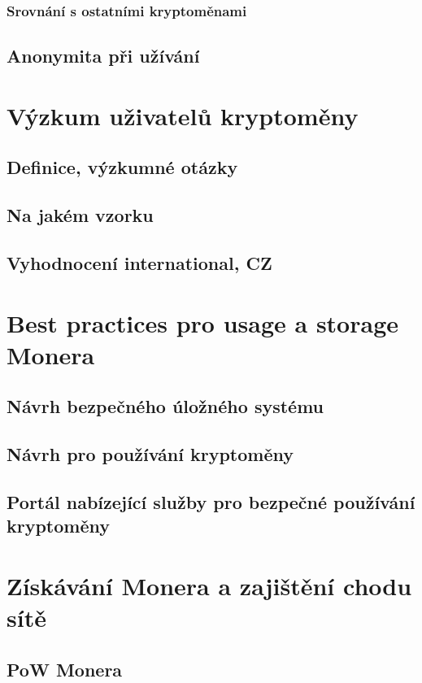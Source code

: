 \documentclass[
  printed, %
  table,   %
  nolof,     %
  nolot,     %
           oneside, color
]{fithesis3}
\begin{document}
\subsection{Srovnání s ostatními kryptoměnami}

\section{Anonymita při užívání}

\chapter{Výzkum uživatelů kryptoměny}
\section{Definice, výzkumné otázky}
\section{Na jakém vzorku}
\section{Vyhodnocení international, CZ}

\chapter{Best practices pro usage a storage Monera}
\section{Návrh bezpečného úložného systému}
\section{Návrh pro používání kryptoměny}
\section{Portál nabízející služby pro bezpečné používání kryptoměny}



\chapter{Získávání Monera a zajištění chodu sítě}
\section{PoW Monera}
\end{document}
